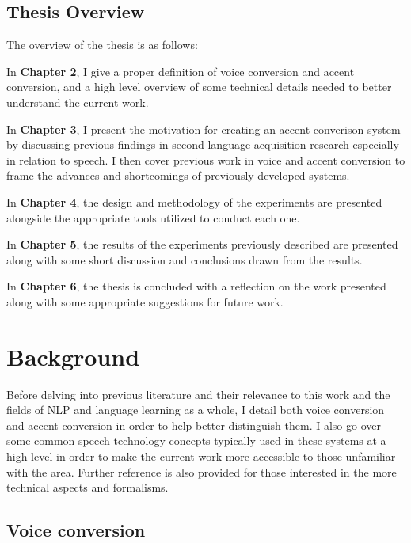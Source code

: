 \documentclass
[
    a4paper,
    twoside,
    12pt,
]
{report}
\begin{document}
\hypertarget{thesis-overview}{%
\section{Thesis Overview}\label{thesis-overview}}

The overview of the thesis is as follows:

In \textbf{Chapter 2}, I give a proper definition of voice conversion
and accent conversion, and a high level overview of some technical
details needed to better understand the current work.

In \textbf{Chapter 3}, I present the motivation for creating an accent
converison system by discussing previous findings in second language
acquisition research especially in relation to speech. I then cover
previous work in voice and accent conversion to frame the advances and
shortcomings of previously developed systems.

In \textbf{Chapter 4}, the design and methodology of the experiments are
presented alongside the appropriate tools utilized to conduct each one.

In \textbf{Chapter 5}, the results of the experiments previously
described are presented along with some short discussion and conclusions
drawn from the results.

In \textbf{Chapter 6}, the thesis is concluded with a reflection on the
work presented along with some appropriate suggestions for future work.
\cleardoublepage

\chapter{Background}

Before delving into previous literature and their relevance to this work
and the fields of NLP and language learning as a whole, I detail both
voice conversion and accent conversion in order to help better
distinguish them. I also go over some common speech technology concepts
typically used in these systems at a high level in order to make the
current work more accessible to those unfamiliar with the area. Further
reference is also provided for those interested in the more technical
aspects and formalisms.

\hypertarget{voice-conversion}{%
\section{Voice conversion}\label{voice-conversion}}
\end{document}
